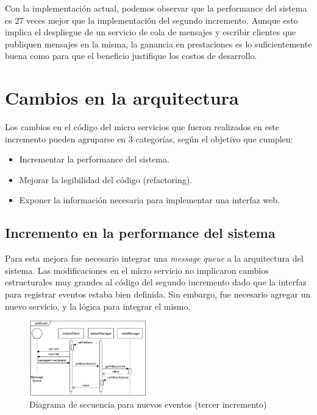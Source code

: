 \documentclass[a4paper,10pt, oneside]{article}
\begin{document}
Con la implementación actual, podemos observar que la performance del sistema es 27 veces mejor que la implementación del segundo incremento. Aunque esto implica el despliegue de un servicio de cola de mensajes y escribir clientes que publiquen mensajes en la misma, la ganancia en prestaciones es lo suficientemente buena como para que el beneficio justifique los costos de desarrollo.

\section{Cambios en la arquitectura}
Los cambios en el código del micro servicios que fueron realizados en este incremento  pueden agruparse en 3 categorías, según el objetivo que cumplen:
\begin{itemize}
	\item Incrementar la performance del sistema.
	\item Mejorar la legibilidad del código (refactoring).
	\item Exponer la información necesaria para implementar una interfaz web.
\end{itemize}

\subsection{Incremento en la performance del sistema}
Para esta mejora fue necesario integrar una \textit{message queue} a la arquitectura del sistema. Las modificaciones en el micro servicio no implicaron cambios estructurales muy grandes al código del segundo incremento dado que la interfaz para registrar eventos estaba bien definida. Sin embargo, fue necesario agregar un nuevo servicio, y la lógica para integrar el mismo. 

\begin{figure}[htbp]
	\centering
	\includegraphics[width=0.45\textwidth]{./graph/SecDiag-resourceAddEventMosquitto.pdf}
	\caption{Diagrama de secuencia para nuevos eventos (tercer incremento)}
	\label{fig:SecDiagResourceAddEvent-Mosquitto}
\end{figure}
\end{document}
